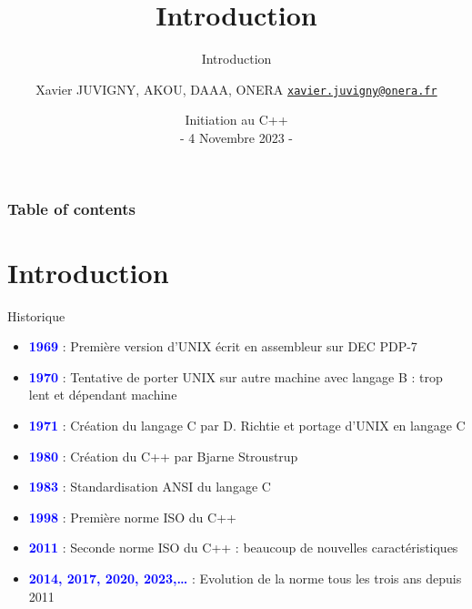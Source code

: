 \documentclass[compress,10pt,aspectratio=169]{beamer}
\title[Initiation C++\hspace{2em}]{Introduction}
\subtitle{Introduction}
\author[X. JUVIGNY]{Xavier JUVIGNY, AKOU, DAAA, ONERA \href{mailto:xavier.juvigny@onera.fr}{\texttt{xavier.juvigny@onera.fr}} }
\date[04/11/2023]{Initiation au C++ \\- 4 Novembre 2023 -}
\institute{\inst{1}ONERA,\inst{2}DAAA}
\begin{document}
\MakeTitlePage

\begin{frame}
\frametitle{Table of contents}
\begin{multicols}{2}
\tableofcontents[hideallsubsections]
\end{multicols}
\end{frame}

\section{Introduction}

\begin{frame}{Historique}
    \scriptsize

    \begin{itemize}
        \item \textbf{\textcolor{blue}{1969}} : Première version d'UNIX écrit en assembleur sur DEC PDP-7
        \item \textbf{\textcolor{blue}{1970}} : Tentative de porter UNIX sur autre machine avec langage B : trop lent et dépendant machine
        \item \textbf{\textcolor{blue}{1971}} : Création du langage C par D. Richtie et portage d'UNIX en langage C 
        \item \textbf{\textcolor{blue}{1980}} : Création du C++ par Bjarne Stroustrup
        \item \textbf{\textcolor{blue}{1983}} : Standardisation ANSI du langage C 
        \item \textbf{\textcolor{blue}{1998}} : Première norme ISO du C++
        \item \textbf{\textcolor{blue}{2011}} : Seconde norme ISO du C++ : beaucoup de nouvelles caractéristiques 
        \item \textbf{\textcolor{blue}{2014, 2017, 2020, 2023,\ldots}} : Evolution de la norme tous les trois ans depuis 2011
    \end{itemize}
\end{frame}
\end{document}
